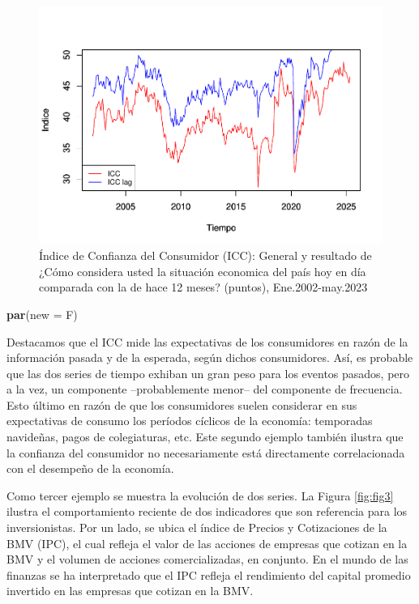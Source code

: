 \documentclass[
]{book}
\newenvironment{Shaded}{\begin{snugshade}}{\end{snugshade}}
\newcommand{\AttributeTok}[1]{\textcolor[rgb]{0.13,0.29,0.53}{#1}}
\newcommand{\FunctionTok}[1]{\textcolor[rgb]{0.13,0.29,0.53}{\textbf{#1}}}
\newcommand{\NormalTok}[1]{#1}
\begin{document}
\begin{figure}

{\centering \includegraphics{Notas-Series-Tiempo_files/figure-latex/fig2-1} 

}

\caption{Índice de Confianza del Consumidor (ICC): General y resultado de ¿Cómo considera usted la situación economica del país hoy en día comparada con la de hace 12 meses? (puntos), Ene.2002-may.2023}\label{fig:fig2}
\end{figure}

\begin{Shaded}
\begin{Highlighting}[]
\FunctionTok{par}\NormalTok{(}\AttributeTok{new =}\NormalTok{ F)}
\end{Highlighting}
\end{Shaded}

Destacamos que el ICC mide las expectativas de los consumidores en razón de la información pasada y de la esperada, según dichos consumidores. Así, es probable que las dos series de tiempo exhiban un gran peso para los eventos pasados, pero a la vez, un componente --probablemente menor-- del componente de frecuencia. Esto último en razón de que los consumidores suelen considerar en sus expectativas de consumo los períodos cíclicos de la economía: temporadas navideñas, pagos de colegiaturas, etc. Este segundo ejemplo también ilustra que la confianza del consumidor no necesariamente está directamente correlacionada con el desempeño de la economía.

Como tercer ejemplo se muestra la evolución de dos series. La Figura \ref{fig:fig3} ilustra el comportamiento reciente de dos indicadores que son referencia para los inversionistas. Por un lado, se ubica el índice de Precios y Cotizaciones de la BMV (IPC), el cual refleja el valor de las acciones de empresas que cotizan en la BMV y el volumen de acciones comercializadas, en conjunto. En el mundo de las finanzas se ha interpretado que el IPC refleja el rendimiento del capital promedio invertido en las empresas que cotizan en la BMV.
\end{document}
